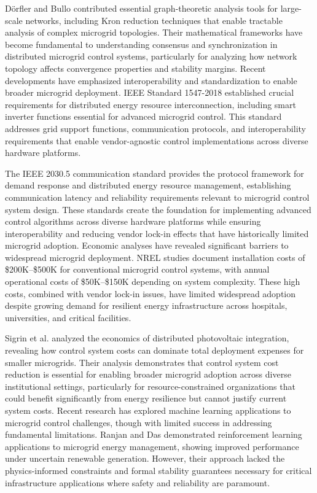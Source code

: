 \documentclass[12pt]{article}
\begin{document}
Dörfler and Bullo \cite{dorfler2013} contributed essential graph-theoretic analysis tools for large-scale networks, including Kron reduction techniques that enable tractable analysis of complex microgrid topologies. Their mathematical frameworks have become fundamental to understanding consensus and synchronization in distributed microgrid control systems, particularly for analyzing how network topology affects convergence properties and stability margins. Recent developments have emphasized interoperability and standardization to enable broader microgrid deployment. IEEE Standard 1547-2018 \cite{ieee1547} established crucial requirements for distributed energy resource interconnection, including smart inverter functions essential for advanced microgrid control. This standard addresses grid support functions, communication protocols, and interoperability requirements that enable vendor-agnostic control implementations across diverse hardware platforms.

The IEEE 2030.5 communication standard \cite{ieee2030} provides the protocol framework for demand response and distributed energy resource management, establishing communication latency and reliability requirements relevant to microgrid control system design. These standards create the foundation for implementing advanced control algorithms across diverse hardware platforms while ensuring interoperability and reducing vendor lock-in effects that have historically limited microgrid adoption. Economic analyses have revealed significant barriers to widespread microgrid deployment. NREL studies \cite{anderson2021,hirsch2018} document installation costs of \$200K--\$500K for conventional microgrid control systems, with annual operational costs of \$50K--\$150K depending on system complexity. These high costs, combined with vendor lock-in issues, have limited widespread adoption despite growing demand for resilient energy infrastructure across hospitals, universities, and critical facilities.

Sigrin et al. \cite{sigrin2016} analyzed the economics of distributed photovoltaic integration, revealing how control system costs can dominate total deployment expenses for smaller microgrids. Their analysis demonstrates that control system cost reduction is essential for enabling broader microgrid adoption across diverse institutional settings, particularly for resource-constrained organizations that could benefit significantly from energy resilience but cannot justify current system costs. Recent research has explored machine learning applications to microgrid control challenges, though with limited success in addressing fundamental limitations. Ranjan and Das \cite{ranjan2021} demonstrated reinforcement learning applications to microgrid energy management, showing improved performance under uncertain renewable generation. However, their approach lacked the physics-informed constraints and formal stability guarantees necessary for critical infrastructure applications where safety and reliability are paramount.
\end{document}
